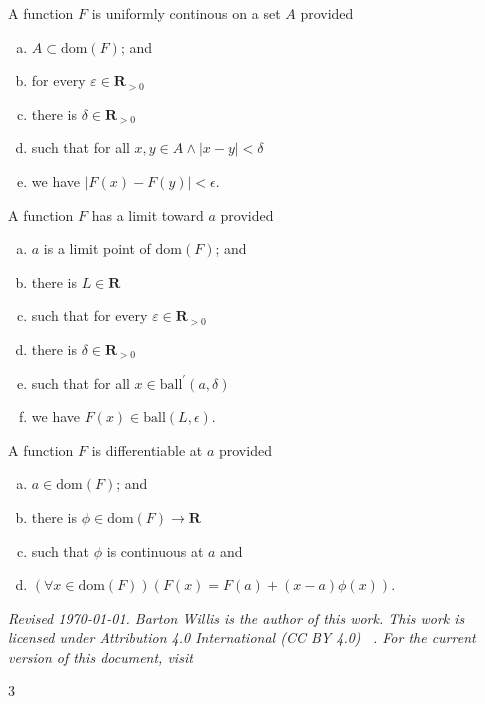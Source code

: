 \documentclass[letterpaper,landscape,9pt,fleqn]{extarticle}
\newcommand{\dom}{\mathrm{dom}}
\newcommand{\reals}{\mathbf{R}}
\newcommand{\ball}{\mathrm{ball}}
\newenvironment{alphalist}{
  \begin{enumerate}[(a)]
    \addtolength{\itemsep}{-1.0\itemsep}}
  {\end{enumerate}}
\begin{document}
\begin{multicols*}{3}
\begin{description}[\itemsep=0em]
    \item[Uniformly continuous]  A function $F$ is uniformly continous on a set $A$ provided 
       \begin{alphalist}
          \item $A \subset \dom(F)$; and
          \item for every $\varepsilon \in \reals_{>0}$
          \item there is $\delta \in \reals_{>0}$
          \item such that for all $x,y  \in A \land |x-y| < \delta$
          \item we have $|F(x) - F(y)| < \epsilon$.
       \end{alphalist} 
    \item[Limit]  A function $F$ has a limit toward $a$ provided
       \begin{alphalist}
          \item $a$ is a limit point of $\dom(F)$; and
          \item there is $L \in \reals$
          \item such that for every $\varepsilon \in \reals_{>0}$
          \item there is $\delta \in \reals_{>0}$
          \item such that for all $x \in \ball^\prime(a,\delta)$
          \item we have $F(x) \in \ball(L, \epsilon)$.
       \end{alphalist} 

    \item[Differentiable] A function $F$ is differentiable at $a$ provided
     \begin{alphalist}
    \item $a \in \dom(F)$; and
       \item there is $\phi \in \dom(F) \to \reals$
       \item such that $\phi$ is continuous at $a$ and
       \item $(\forall x \in \dom(F))(F(x) = F(a) + (x-a) \phi(x))$.
     \end{alphalist}

\end{description}


\vfill
\noindent \emph{Revised \today. Barton Willis is the author of this work. This work is
licensed under Attribution 4.0 International (CC BY 4.0) \,  . For the current version of
this document, visit \, }

\end{multicols*}{3}
\end{document}
